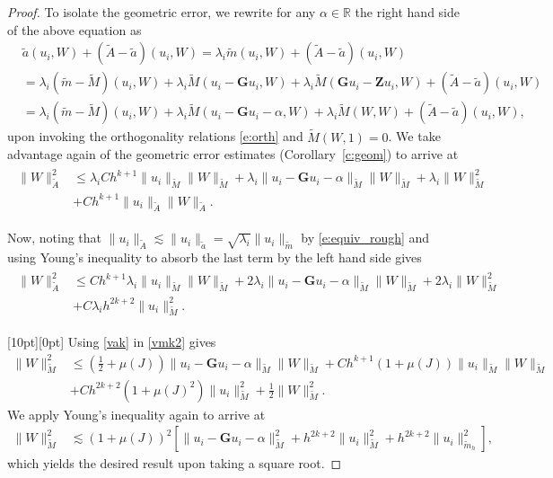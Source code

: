 \documentclass{siamart0516}
\newcommand{\mk}{\tilde{m}_h}
\newcommand{\bG}{\ensuremath{\boldsymbol G}}
\newcommand{\bZ}{\ensuremath{\boldsymbol Z}}
\newcommand{\step}[1]{\noindent\raisebox{1.5pt}[10pt][0pt]{\tiny\framebox{$#1$}}\xspace}
\numberwithin{equation}{section}
\numberwithin{theorem}{section}
\numberwithin{figure}{section}
\begin{document}
\begin{proof}
To isolate the geometric error, we rewrite for any $\alpha \in \mathbb R$ the right hand side of the above equation as
\begin{align*}
&\tilde a(u_i,W) + (\widetilde A-\tilde a)(u_i,W) = \lambda_i \tilde m(u_i,W) + (\widetilde A-\tilde a)(u_i,W) \\
& = \lambda_i (\tilde m-\widetilde M)(u_i,W) + \lambda_i \widetilde M(u_i-\bG u_i,W) + \lambda_i \widetilde M(\bG u_i-\bZ u_i,W) + (\widetilde A-\tilde a)(u_i,W)\\
& = \lambda_i (\tilde m-\widetilde M)(u_i,W) + \lambda_i \widetilde M(u_i-\bG u_i-\alpha,W) + \lambda_i \widetilde M(W,W) + (\widetilde A-\tilde a)(u_i,W),
\end{align*}
upon invoking the orthogonality relations \eqref{e:orth} and $\widetilde M(W,1)=0$. 
We take advantage again of the geometric error estimates (Corollary~\ref{c:geom}) to arrive at
\begin{align}
\begin{aligned}
\|W\|_{\widetilde A}^2 &\leq \lambda_i C h^{k+1}\|u_i\|_{\widetilde M}\|W\|_{\widetilde M} + \lambda_i \|u_i-\bG u_i-\alpha \|_{\widetilde M} \|W\|_{\widetilde M} +\lambda_i\|W\|_{\widetilde M}^2\\
&+ C h^{k+1}\|u_i\|_{\widetilde A}\|W\|_{\widetilde A}.
\end{aligned}
\label{vak0}
\end{align}

Now, noting that  $\|u_i\|_{\widetilde A}\lesssim \|u_i\|_{\tilde a}= \sqrt{\lambda_i}\|u_i\|_{\tilde m}$ by \eqref{e:equiv_rough}   and using Young's inequality to absorb the last term by the left hand side gives
\begin{align}
\begin{aligned}
\|W\|_{\widetilde A}^2 &\leq  C h^{k+1}\lambda_i\|u_i\|_{\widetilde M}\|W\|_{\widetilde M} + 2 \lambda_i\|u_i-\bG u_i-\alpha\|_{\widetilde M} \|W\|_{\widetilde M} +2\lambda_i \|W\|_{\widetilde M}^2\\
& + C\lambda_i h^{2k+2} \|u_i\|_{\widetilde M}^2.
\end{aligned}
\label{vak}
\end{align}

\step{5} Using \eqref{vak} in \eqref{vmk2} gives
\begin{align*}
\|W\|_{\widetilde M}^2 & \leq \left(\frac{1}{2} +\mu(J)\right)\|u_i-\bG u_i-\alpha\|_{\widetilde M}\|W\|_{\widetilde M}
+  Ch^{k+1}\left(1+\mu(J)\right)\|u_i\|_{\widetilde M}\|W\|_{\widetilde M}\\
& 
+ Ch^{2k+2}\left(1+\mu(J)^2\right)\|u_i\|_{\widetilde M}^2 + \frac{1}{2}\|W\|_{\widetilde M}^2.
\end{align*}
We apply Young's inequality again to arrive at
\begin{align*}
\|W\|_{\widetilde M}^2 &\lesssim (1 +\mu(J))^2 \left [ \|u_i-\bG u_i-\alpha\|_{\widetilde M}^2
+  h^{2k+2} \|u_i\|_{\widetilde M}^2+ h^{2k+2} \|u_i\|_{\mk}^2 \right ],
\end{align*}
which yields the desired result upon taking a square root.
\end{proof}
\end{document}
